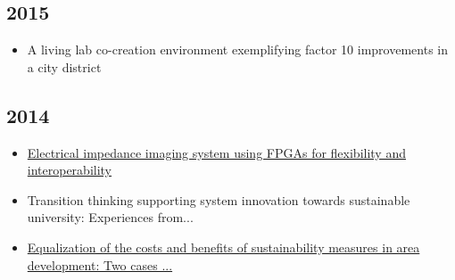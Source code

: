 \subsection*{2015}
\begin{itemize}[leftmargin=*, itemsep=0em, label=\textbullet]
\small
\item A living lab co-creation environment exemplifying factor 10 improvements in a city district
\end{itemize}

\subsection*{2014}
\begin{itemize}[leftmargin=*, itemsep=0em, label=\textbullet]
\small
\item \href{https://doi.org/10.1186/1475-925X-13-126}{Electrical impedance imaging system using FPGAs for flexibility and interoperability}
\item Transition thinking supporting system innovation towards sustainable university: Experiences from...
\item \href{https://doi.org/10.2495/EID140231}{Equalization of the costs and benefits of sustainability measures in area development: Two cases ...}
\end{itemize}


